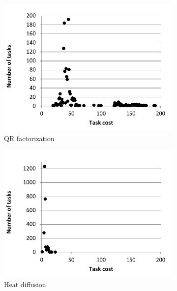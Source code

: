 \begin{figure}[!t]
\begin{subfigure}[b]{0.3\textwidth}
  \includegraphics[width=\textwidth]{Figs/QR_16x16_distribution.pdf}
  \caption{QR factorization}
  \label{qr_dist}
\end{subfigure}
\begin{subfigure}[b]{0.3\textwidth}
  \includegraphics[width=\textwidth]{Figs/heat_16x16_distribution.pdf}
  \caption{Heat diffusion}
  \label{heat_dist}
\end{subfigure}
\begin{subfigure}[b]{0.3\textwidth}

\end{subfigure}
\end{figure}
